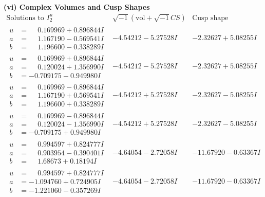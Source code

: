 \documentclass[1p]{elsarticle_modified}
\theoremstyle{definition}
\newcommand{\I}{\sqrt{-1}}
\begin{document}
\newpage\flushleft \textbf{(vi) Complex Volumes and Cusp Shapes}
$$\begin{array}{c|c|c}  
\text{Solutions to }I^u_{2}& \I (\text{vol} + \sqrt{-1}CS) & \text{Cusp shape}\\
 \hline 
\begin{aligned}
u &= \phantom{-}0.169969 + 0.896844 I \\
a &= \phantom{-}1.167190 - 0.569541 I \\
b &= \phantom{-}1.196600 - 0.338289 I\end{aligned}
 & -4.54212 - 5.27528 I & -2.32627 + 5.08255 I \\ \hline\begin{aligned}
u &= \phantom{-}0.169969 + 0.896844 I \\
a &= \phantom{-}0.120024 + 1.356990 I \\
b &= -0.709175 - 0.949980 I\end{aligned}
 & -4.54212 - 5.27528 I & -2.32627 + 5.08255 I \\ \hline\begin{aligned}
u &= \phantom{-}0.169969 - 0.896844 I \\
a &= \phantom{-}1.167190 + 0.569541 I \\
b &= \phantom{-}1.196600 + 0.338289 I\end{aligned}
 & -4.54212 + 5.27528 I & -2.32627 - 5.08255 I \\ \hline\begin{aligned}
u &= \phantom{-}0.169969 - 0.896844 I \\
a &= \phantom{-}0.120024 - 1.356990 I \\
b &= -0.709175 + 0.949980 I\end{aligned}
 & -4.54212 + 5.27528 I & -2.32627 - 5.08255 I \\ \hline\begin{aligned}
u &= \phantom{-}0.994597 + 0.824777 I \\
a &= \phantom{-}0.903954 - 0.390401 I \\
b &= \phantom{-}1.68673 + 0.18194 I\end{aligned}
 & -4.64054 - 2.72058 I & -11.67920 - 0.63367 I \\ \hline\begin{aligned}
u &= \phantom{-}0.994597 + 0.824777 I \\
a &= -1.094760 + 0.724905 I \\
b &= -1.221060 - 0.357269 I\end{aligned}
 & -4.64054 - 2.72058 I & -11.67920 - 0.63367 I \\ \hline\begin{aligned}

\end{aligned}
\end{array}$$
\end{document}
